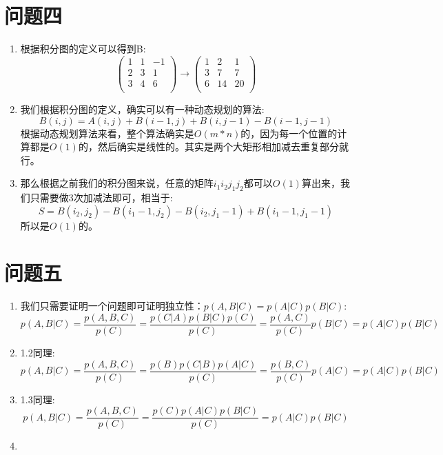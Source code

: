 \documentclass[answers]{exam}  %
\begin{document}
\section{问题四}
\begin{enumerate}[label=\alph*.] 
    \item 根据积分图的定义可以得到B:
    \[  
        \begin{pmatrix}
            1 & 1 & -1 \\
            2 & 3 & 1  \\
            3 & 4 & 6  \\
        \end{pmatrix}
        \rightarrow    
        \begin{pmatrix}
            1 & 2 & 1 \\ 
            3 & 7 & 7 \\
            6 & 14 & 20 \\
        \end{pmatrix}
    \]
    \item 我们根据积分图的定义，确实可以有一种动态规划的算法:
    \[
        B(i,j) = A(i, j) + B(i-1, j) + B(i,j -1) - B(i-1, j-1)
    \]
    根据动态规划算法来看，整个算法确实是$O(m*n)$的，因为每一个位置的计算都是$O(1)$的，然后确实是线性的。其实是两个大矩形相加减去重复部分就行。
    \item 那么根据之前我们的积分图来说，任意的矩阵$i_1i_2j_1j_2$都可以$O(1)$算出来，我们只需要做3次加减法即可，相当于:
    \[
        S  =B(i_2,j_2) - B(i_1- 1, j_2) - B(i_2, j_1-1) + B(i_1-1, j_1-1)
    \]  
    所以是$O(1)$的。
\end{enumerate}


\section{问题五}
\begin{enumerate}[label=\alph*.] 
    \item 我们只需要证明一个问题即可证明独立性：$p(A, B|C) = p(A|C)p(B|C)$:
    \[
        p(A, B|C) = \frac{p(A, B, C)}{p(C)} = \frac{p(C|A)p(B|C)p(C)}{p(C)} = \frac{p(A, C)}{p(C)} p(B|C)=p(A|C)p(B|C)
    \]
    \item 1.2同理:
    \[
        p(A, B|C) = \frac{p(A, B, C)}{p(C)} = \frac{p(B)p(C|B)p(A|C)}{p(C)} = \frac{p(B, C)}{p(C)} p(A|C)=p(A|C)p(B|C)
    \]
    \item 1.3同理:
    \[
        p(A, B|C) = \frac{p(A, B, C)}{p(C)} = \frac{p(C)p(A|C)p(B|C)}{p(C)} = p(A|C)p(B|C)
    \]
    \item 
\end{enumerate}
\end{document}
